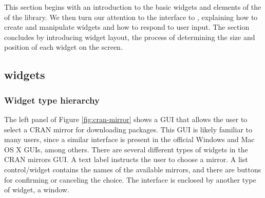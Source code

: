 \documentclass[article,shortnames]{jss}
\begin{document}
This section begins with an introduction to the basic widgets and
elements of the of the  library.  We then turn our attention
to the  interface to , explaining how to
create and manipulate widgets and how to respond to user input. The
section concludes by introducing widget layout, the process of
determining the size and position of each widget on the screen.


\subsection[GTK+ widgets]{ widgets}

\subsubsection{Widget type hierarchy}


The left panel of Figure \ref{fig:cran-mirror} shows a  GUI
that allows the user to select a CRAN mirror for downloading
 packages.  This GUI is likely familiar to many
 users, since a similar interface is present in the
official Windows and Mac OS X  GUIs, among others.  There
are several different types of widgets in the CRAN mirrors GUI.  A
text label instructs the user to choose a mirror.  A list
control/widget contains the names of the available mirrors, and there
are buttons for confirming or canceling the choice.  The interface is
enclosed by another type of widget, a window.
\end{document}
